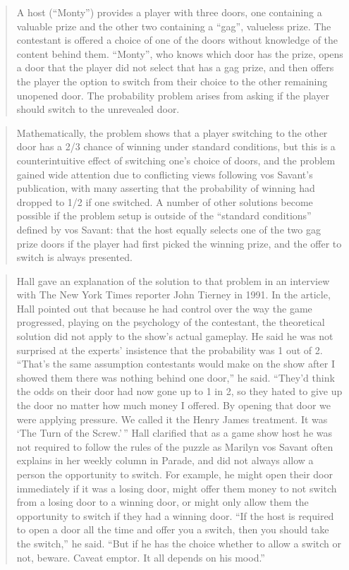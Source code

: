 \documentclass[
]{book}
\begin{document}
\begin{quote}
A host (``Monty'') provides a player with three doors, one containing a valuable prize and the other two containing a ``gag'', valueless prize. The contestant is offered a choice of one of the doors without knowledge of the content behind them. ``Monty'', who knows which door has the prize, opens a door that the player did not select that has a gag prize, and then offers the player the option to switch from their choice to the other remaining unopened door. The probability problem arises from asking if the player should switch to the unrevealed door.
\end{quote}

\begin{quote}
Mathematically, the problem shows that a player switching to the other door has a 2/3 chance of winning under standard conditions, but this is a counterintuitive effect of switching one's choice of doors, and the problem gained wide attention due to conflicting views following vos Savant's publication, with many asserting that the probability of winning had dropped to 1/2 if one switched. A number of other solutions become possible if the problem setup is outside of the ``standard conditions'' defined by vos Savant: that the host equally selects one of the two gag prize doors if the player had first picked the winning prize, and the offer to switch is always presented.
\end{quote}

\begin{quote}
Hall gave an explanation of the solution to that problem in an interview with The New York Times reporter John Tierney in 1991. In the article, Hall pointed out that because he had control over the way the game progressed, playing on the psychology of the contestant, the theoretical solution did not apply to the show's actual gameplay. He said he was not surprised at the experts' insistence that the probability was 1 out of 2. ``That's the same assumption contestants would make on the show after I showed them there was nothing behind one door,'' he said. ``They'd think the odds on their door had now gone up to 1 in 2, so they hated to give up the door no matter how much money I offered. By opening that door we were applying pressure. We called it the Henry James treatment. It was `The Turn of the Screw.'\,'' Hall clarified that as a game show host he was not required to follow the rules of the puzzle as Marilyn vos Savant often explains in her weekly column in Parade, and did not always allow a person the opportunity to switch. For example, he might open their door immediately if it was a losing door, might offer them money to not switch from a losing door to a winning door, or might only allow them the opportunity to switch if they had a winning door. ``If the host is required to open a door all the time and offer you a switch, then you should take the switch,'' he said. ``But if he has the choice whether to allow a switch or not, beware. Caveat emptor. It all depends on his mood.''
\end{quote}
\end{document}
